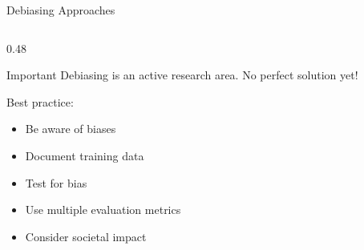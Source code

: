 \documentclass[aspectratio=169]{beamer}
\begin{document}
\begin{frame}[shrink=10]{Debiasing Approaches 🔧}
\begin{columns}[T]
\begin{column}{0.48\textwidth}
\vspace{1em}
\begin{alertblock}{Important}
Debiasing is an active research area. No perfect solution yet!

Best practice:
\begin{itemize}\setlength{\itemsep}{0pt}
    \item Be aware of biases
    \item Document training data
    \item Test for bias
    \item Use multiple evaluation metrics
    \item Consider societal impact
\end{itemize}
\end{alertblock}
\end{column}
\end{columns}
\end{frame}
\end{document}
